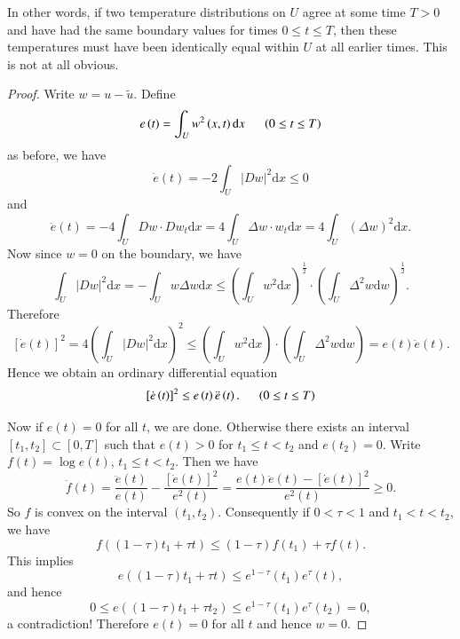 In other words, if two temperature distributions on $U$ agree at some time $T>0$ and have had the same boundary values for times $0\le t\le T$, then these temperatures must have been identically equal within $U$ at all earlier times. This is not at all obvious.
\begin{proof}
Write $w=u-\widetilde{u}$. Define 
$$
e\left( t \right) =\int_U{w^2\left( x,t \right) \mathrm{d}x}\hspace{0.5cm}\left( 0\le t\le T \right) 
$$
as before, we have 
$$
\dot{e}\left( t \right) =-2\int_U{\left| Dw \right|^2\mathrm{d}x}\le 0
$$
and 
$$
\ddot{e}\left( t \right) =-4\int_U{Dw\cdot Dw_t\mathrm{d}x}=4\int_U{\Delta w\cdot w_t\mathrm{d}x}=4\int_U{\left( \Delta w \right) ^2\mathrm{d}x}.
$$
Now since $w=0$ on the boundary, we have 
$$
\int_U{\left| Dw \right|^2\mathrm{d}x}=-\int_U{w\Delta w\mathrm{d}x}\le \left( \int_U{w^2\mathrm{d}x} \right) ^{\frac{1}{2}}\cdot \left( \int_U{\Delta ^2w\mathrm{d}w} \right) ^{\frac{1}{2}}.
$$
Therefore 
$$
\left[ \dot{e}\left( t \right) \right] ^2=4\left( \int_U{\left| Dw \right|^2\mathrm{d}x} \right) ^2\le \left( \int_U{w^2\mathrm{d}x} \right) \cdot \left( \int_U{\Delta ^2w\mathrm{d}w} \right) =e\left( t \right) \ddot{e}\left( t \right) .
$$
Hence we obtain an ordinary differential equation 
$$
\left[ \dot{e}\left( t \right) \right] ^2\le e\left( t \right) \ddot{e}\left( t \right) .\hspace{0.5cm}\left( 0\le t\le T \right) 
$$\par
Now if $e(t)=0$ for all $t$, we are done. Otherwise there exists an interval $[t_1,t_2]\subset [0,T]$ such that $e(t)>0$ for $t_1\le t< t_2$ and $e(t_2)=0$. Write $f(t)=\log e(t)$, $t_1\le t<t_2$. Then we have 
$$
\ddot{f}\left( t \right) =\frac{\ddot{e}\left( t \right)}{e\left( t \right)}-\frac{\left[ \dot{e}\left( t \right) \right] ^2}{e^2\left( t \right)}=\frac{e\left( t \right) \ddot{e}\left( t \right) -\left[ \dot{e}\left( t \right) \right] ^2}{e^2\left( t \right)}\ge 0.
$$
So $f$ is convex on the interval $(t_1,t_2)$. Consequently if $0<\tau<1$ and $t_1<t<t_2$, we have 
$$
f\left( \left( 1-\tau \right) t_1+\tau t \right) \le \left( 1-\tau \right) f\left( t_1 \right) +\tau f\left( t \right) .
$$
This implies 
$$
e\left( \left( 1-\tau \right) t_1+\tau t \right) \le e^{1-\tau}\left( t_1 \right) e^{\tau}\left( t \right) ,
$$
and hence 
$$
0\le e\left( \left( 1-\tau \right) t_1+\tau t_2 \right) \le e^{1-\tau}\left( t_1 \right) e^{\tau}\left( t_2 \right) =0,
$$
a contradiction! Therefore $e(t)=0$ for all $t$ and hence $w=0$.
\end{proof}
